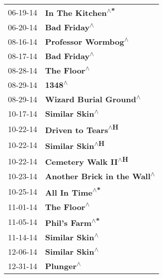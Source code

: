 \begin{supertabular}{p{0.25\columnwidth}p{0.75\columnwidth}}
 06-19-14 &              \textbf{In The Kitchen\textsuperscript{$\wedge$*}} \\
 06-20-14 &                   \textbf{Bad Friday\textsuperscript{$\wedge$}} \\
 08-16-14 &            \textbf{Professor Wormbog\textsuperscript{$\wedge$}} \\
 08-17-14 &                   \textbf{Bad Friday\textsuperscript{$\wedge$}} \\
 08-28-14 &                    \textbf{The Floor\textsuperscript{$\wedge$}} \\
 08-29-14 &                         \textbf{1348\textsuperscript{$\wedge$}} \\
 08-29-14 &         \textbf{Wizard Burial Ground\textsuperscript{$\wedge$}} \\
 10-17-14 &                 \textbf{Similar Skin\textsuperscript{$\wedge$}} \\
 10-22-14 &             \textbf{Driven to Tears\textsuperscript{$\wedge$H}} \\
 10-22-14 &                \textbf{Similar Skin\textsuperscript{$\wedge$H}} \\
 10-22-14 &            \textbf{Cemetery Walk II\textsuperscript{$\wedge$H}} \\
 10-23-14 &    \textbf{Another Brick in the Wall\textsuperscript{$\wedge$}} \\
 10-25-14 &                 \textbf{All In Time\textsuperscript{$\wedge$*}} \\
 11-01-14 &                    \textbf{The Floor\textsuperscript{$\wedge$}} \\
 11-05-14 &                 \textbf{Phil's Farm\textsuperscript{$\wedge$*}} \\
 11-14-14 &                 \textbf{Similar Skin\textsuperscript{$\wedge$}} \\
 12-06-14 &                 \textbf{Similar Skin\textsuperscript{$\wedge$}} \\
 12-31-14 &                      \textbf{Plunger\textsuperscript{$\wedge$}} \\
\end{supertabular}
